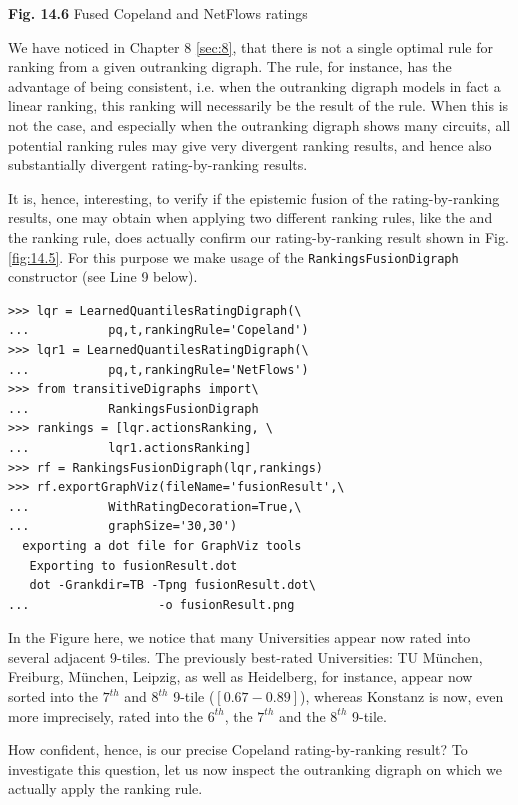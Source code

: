 \begin{minipage}{7cm}
\textbf{Fig. 14.6} Fused Copeland and NetFlows ratings

\noindent We have noticed in Chapter 8 \ref{sec:8}, that there is not a single optimal rule for ranking from a given outranking digraph. The \Copeland rule, for instance, has the advantage of being \Condorcet consistent, i.e. when the outranking digraph models in fact a linear ranking, this ranking will necessarily be the result of the \Copeland* rule. When this is not the case, and especially when the outranking digraph shows many circuits, all potential ranking rules may give very divergent ranking results, and hence also substantially divergent rating-by-ranking results.

It is, hence, interesting, to verify if the epistemic fusion of the rating-by-ranking results, one may obtain when applying two different ranking rules, like the \Copeland and the \NetFlows ranking rule, does actually confirm our rating-by-ranking result shown in Fig. \ref{fig:14.5}. For this purpose we make usage of the \texttt{RankingsFusionDigraph} constructor (see Line 9 below).

{\scriptsize
\begin{verbatim}
>>> lqr = LearnedQuantilesRatingDigraph(\
...           pq,t,rankingRule='Copeland')
>>> lqr1 = LearnedQuantilesRatingDigraph(\
...           pq,t,rankingRule='NetFlows')
>>> from transitiveDigraphs import\
...           RankingsFusionDigraph
>>> rankings = [lqr.actionsRanking, \
...           lqr1.actionsRanking]
>>> rf = RankingsFusionDigraph(lqr,rankings)
>>> rf.exportGraphViz(fileName='fusionResult',\
...           WithRatingDecoration=True,\
...           graphSize='30,30')
  exporting a dot file for GraphViz tools
   Exporting to fusionResult.dot
   dot -Grankdir=TB -Tpng fusionResult.dot\
...                  -o fusionResult.png
\end{verbatim}
}
  
In the Figure here, we notice that many Universities appear now rated into several adjacent 9-tiles. The previously best-rated Universities: TU München, Freiburg, München, Leipzig, as well as  Heidelberg, for instance, appear now sorted into the $7^{th}$ and $8^{th}$ 9-tile ($[0.67 - 0.89]$), whereas Konstanz is now, even more imprecisely, rated into the $6^{th}$, the $7^{th}$ and the $8^{th}$ 9-tile.

How confident, hence, is our precise Copeland rating-by-ranking result? To investigate this question, let us now inspect the outranking digraph on which we actually apply the \Copeland ranking rule.

\end{minipage}
